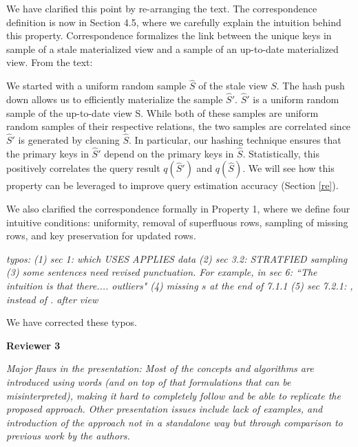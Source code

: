 We have clarified this point by re-arranging the text. The correspondence definition is now in Section 4.5, where we carefully explain the intuition behind this property. Correspondence formalizes the link between the unique keys in sample of a stale materialized view and a sample of an up-to-date materialized view. From the text:\begin{displayquote} 
We started with a uniform random sample $\widehat{S}$ of the stale view $S$. The hash push down allows us to efficiently materialize the sample $\widehat{S}'$. $\widehat{S}'$ is a uniform random sample of the up-to-date view S. While both of these samples are uniform random samples of their respective relations, the two samples are correlated since $\widehat{S}'$ is generated by cleaning $\widehat{S}$. In particular, our hashing technique ensures that the primary keys in $\widehat{S}'$ depend on the primary keys in $\widehat{S}$. Statistically, this positively correlates the query result $q(\widehat{S}')$ and $q(\widehat{S})$. We will see how this property can be leveraged to improve query estimation accuracy (Section \ref{re}).\end{displayquote} 
We also clarified the correspondence formally in Property 1, where we define four intuitive conditions: uniformity, removal of superfluous rows, sampling of missing rows, and key preservation for updated rows.

\vspace{1em}
\emph{typos:
(1) sec 1: which USES APPLIES data
(2) sec 3.2: STRATFIED sampling
(3) some sentences need revised punctuation. For example, in sec 6: ``The intuition is that there.... outliers"
(4) missing $s$ at the end of 7.1.1
(5) sec 7.2.1: , instead of . after view}

We have corrected these typos.

\vspace{1em}
\noindent\textbf{Reviewer 3}

\vspace{1em}
\emph{Major flaws in the presentation: Most of the concepts and algorithms are introduced using words (and on top of that formulations that can be misinterpreted), making it hard to completely follow and be able to replicate the proposed approach. Other presentation issues include lack of examples, and introduction of the approach not in a standalone way but through comparison to previous work by the authors.}

